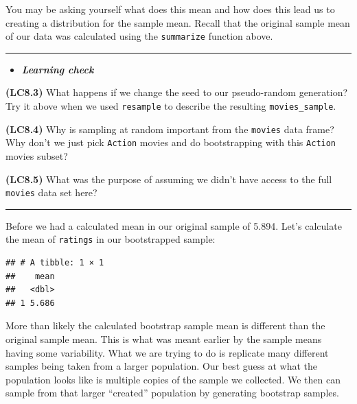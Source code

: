 \documentclass[]{tufte-book}
\newenvironment{Shaded}{\begin{snugshade}}{\end{snugshade}}
\newcommand{\KeywordTok}[1]{\textcolor[rgb]{0.13,0.29,0.53}{\textbf{{#1}}}}
\newcommand{\DataTypeTok}[1]{\textcolor[rgb]{0.13,0.29,0.53}{{#1}}}
\newcommand{\StringTok}[1]{\textcolor[rgb]{0.31,0.60,0.02}{{#1}}}
\newcommand{\NormalTok}[1]{{#1}}
\let\oldrule=\rule
\renewcommand{\rule}[1]{\oldrule{\linewidth}}
\newenvironment{rmdblock}[1]
  {\begin{shaded*}
  \begin{itemize}
  \renewcommand{\labelitemi}{
    \raisebox{-.7\height}[0pt][0pt]{
    }
  }
  \item
  }
  {
  \end{itemize}
  \end{shaded*}
  }
\newenvironment{learncheck}
  {\begin{rmdblock}{warning}}
  {\end{rmdblock}}
\begin{document}
You may be asking yourself what does this mean and how does this lead us
to creating a distribution for the sample mean. Recall that the original
sample mean of our data was calculated using the \texttt{summarize}
function above.

\begin{center}\rule{0.5\linewidth}{\linethickness}\end{center}

\begin{learncheck}
\textbf{\emph{Learning check}}
\end{learncheck}

\textbf{(LC8.3)} What happens if we change the seed to our pseudo-random
generation? Try it above when we used \texttt{resample} to describe the
resulting \texttt{movies\_sample}.

\textbf{(LC8.4)} Why is sampling at random important from the
\texttt{movies} data frame? Why don't we just pick \texttt{Action}
movies and do bootstrapping with this \texttt{Action} movies subset?

\textbf{(LC8.5)} What was the purpose of assuming we didn't have access
to the full \texttt{movies} data set here?

\begin{center}\rule{0.5\linewidth}{\linethickness}\end{center}

Before we had a calculated mean in our original sample of 5.894. Let's
calculate the mean of \texttt{ratings} in our bootstrapped sample:

\begin{Shaded}
\end{Shaded}

\begin{verbatim}
## # A tibble: 1 × 1
##    mean
##   <dbl>
## 1 5.686
\end{verbatim}

More than likely the calculated bootstrap sample mean is different than
the original sample mean. This is what was meant earlier by the sample
means having some variability. What we are trying to do is replicate
many different samples being taken from a larger population. Our best
guess at what the population looks like is multiple copies of the sample
we collected. We then can sample from that larger ``created'' population
by generating bootstrap samples.
\end{document}
